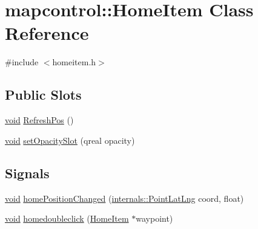 \hypertarget{classmapcontrol_1_1_home_item}{\section{mapcontrol\-:\-:\-Home\-Item \-Class \-Reference}
\label{classmapcontrol_1_1_home_item}
}


{\ttfamily \#include $<$homeitem.\-h$>$}

\subsection*{\-Public \-Slots}
\begin{DoxyCompactItemize}
\item 
\hyperlink{group___u_a_v_objects_plugin_ga444cf2ff3f0ecbe028adce838d373f5c}{void} \hyperlink{group___o_p_map_widget_ga1c60e950a733d8e38796cfe092fb4154}{\-Refresh\-Pos} ()
\item 
\hyperlink{group___u_a_v_objects_plugin_ga444cf2ff3f0ecbe028adce838d373f5c}{void} \hyperlink{group___o_p_map_widget_ga47780346c1ba4c4076c12ea2555a1d8e}{set\-Opacity\-Slot} (qreal opacity)
\end{DoxyCompactItemize}
\subsection*{\-Signals}
\begin{DoxyCompactItemize}
\item 
\hyperlink{group___u_a_v_objects_plugin_ga444cf2ff3f0ecbe028adce838d373f5c}{void} \hyperlink{group___o_p_map_widget_ga0e1509f9592dd23581de347130ed8d85}{home\-Position\-Changed} (\hyperlink{structinternals_1_1_point_lat_lng}{internals\-::\-Point\-Lat\-Lng} coord, float)
\item 
\hyperlink{group___u_a_v_objects_plugin_ga444cf2ff3f0ecbe028adce838d373f5c}{void} \hyperlink{group___o_p_map_widget_ga7d84c3892299fbfa670e98cca3cb871d}{homedoubleclick} (\hyperlink{classmapcontrol_1_1_home_item}{\-Home\-Item} $\ast$waypoint)
\end{DoxyCompactItemize}
